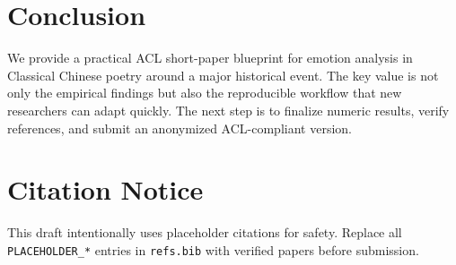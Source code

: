 \documentclass[11pt]{article}
\begin{document}
\section{Conclusion}

We provide a practical ACL short-paper blueprint for emotion analysis in Classical Chinese poetry around a major historical event.
The key value is not only the empirical findings but also the reproducible workflow that new researchers can adapt quickly.
The next step is to finalize numeric results, verify references, and submit an anonymized ACL-compliant version.

\section*{Citation Notice}
\small
This draft intentionally uses placeholder citations for safety. Replace all
\texttt{PLACEHOLDER\_*} entries in \texttt{refs.bib} with verified papers before submission.



\end{document}
